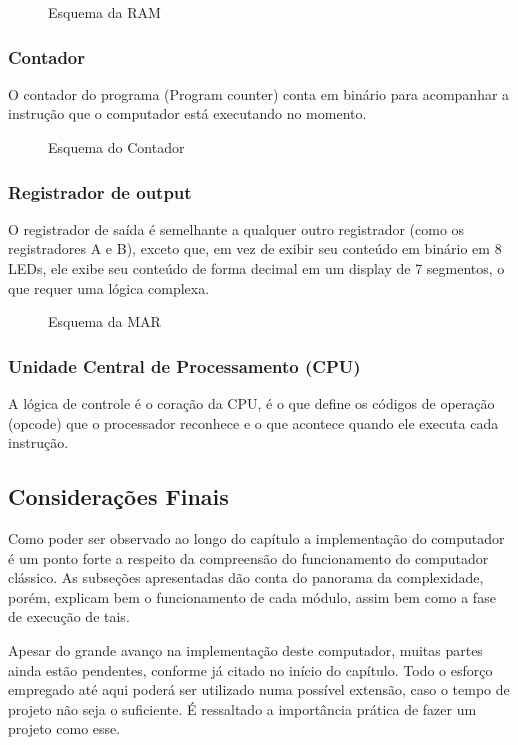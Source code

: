 \vspace{1cm}
\begin{figure}[H] \centering 
  \caption{\label{schematics_ram} Esquema da RAM} 
\end{figure}

\subsubsection{Contador}
O contador do programa (Program counter) conta em binário para acompanhar a instrução que o computador está executando no momento.

\vspace{1cm}
\begin{figure}[H] \centering 
  \caption{\label{schematics_pc} Esquema do Contador} 
\end{figure}

\subsubsection{Registrador de output}
O registrador de saída é semelhante a qualquer outro registrador (como os registradores A e B), exceto que, em vez de exibir seu conteúdo em binário em 8 LEDs, ele exibe seu conteúdo de forma decimal em um display de 7 segmentos, o que requer uma lógica complexa.

\vspace{1cm}
\begin{figure}[H] \centering 
  \caption{\label{schematics_output} Esquema da MAR} 
\end{figure}

\subsubsection{Unidade Central de Processamento (CPU)}
A lógica de controle é o coração da CPU, é o que define os códigos de operação (opcode) que o processador reconhece e o que acontece quando ele executa cada instrução.

\subsection{Considerações Finais}

Como poder ser observado ao longo do capítulo a implementação do computador é um ponto forte a respeito da compreensão do funcionamento do computador clássico. As subseções apresentadas dão conta do panorama da complexidade, porém, explicam bem o funcionamento de cada módulo, assim bem como a fase de execução de tais.

Apesar do grande avanço na implementação deste computador, muitas partes ainda estão pendentes, conforme já citado no início do capítulo. Todo o esforço empregado até aqui poderá ser utilizado numa possível extensão, caso o tempo de projeto não seja o suficiente. É ressaltado a importância prática de fazer um projeto como esse.


\newpage


